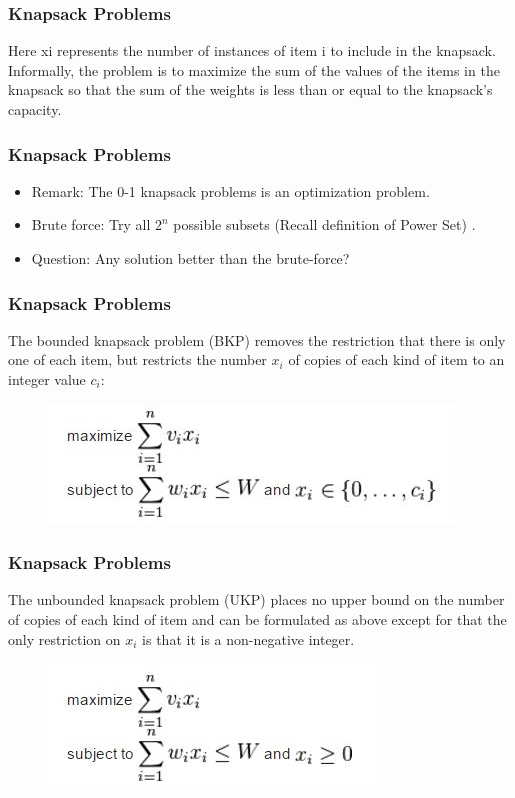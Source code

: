 \documentclass{beamer}
\begin{document}
\begin{frame}
	\frametitle{Knapsack Problems}
	\Large
	Here xi represents the number of instances of item i to include in the knapsack. Informally, the problem is to maximize the sum of the values of the items in the knapsack so that the sum of the weights is less than or equal to the knapsack's capacity.
\end{frame}
\begin{frame}
	\frametitle{Knapsack Problems}
	\Large
\begin{itemize}
\item Remark: The 0-1 knapsack problems is an optimization problem.
	\item Brute force: Try all $2^n$ possible subsets (Recall definition of Power Set)
	.
\item	Question: Any solution better than the brute-force?
\end{itemize}
\end{frame}
\begin{frame}
	\frametitle{Knapsack Problems}
\Large
The bounded knapsack problem (BKP) removes the restriction that there is only one of each item, but restricts the number $x_i$ of copies of each kind of item to an integer value $c_i$:
\begin{figure}
\centering
\includegraphics[width=0.7\linewidth]{boundedknapsack}
\caption{}
\label{fig:boundedknapsack}
\end{figure}
\end{frame}
\begin{frame}
	\frametitle{Knapsack Problems}
	\Large
The unbounded knapsack problem (UKP) places no upper bound on the number of copies of each kind of item and can be formulated as above except for that the only restriction on $x_i$ is that it is a non-negative integer.
	\begin{figure}
\centering
\includegraphics[width=0.7\linewidth]{unboundedknapsack}
\caption{}
\label{fig:unboundedknapsack}
\end{figure}

\end{frame}
\end{document}
